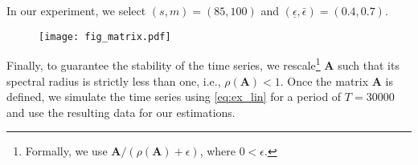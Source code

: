 In our experiment, we select $(s,m)=(85,100)$ and $(\underline{\epsilon},\bar{\epsilon})=(0.4,0.7)$. 
\begin{figure}
    \centering
    \texttt{[image: fig\_matrix.pdf]}
    \label{fig:matrix}
\end{figure}
Finally, to guarantee the stability of the time series, we rescale\footnote{Formally, we use $\textbf{A}/(\rho(\textbf{A}) + \epsilon)$, where $0<\epsilon$.} $\textbf{A}$ such that its spectral radius is strictly less than one, i.e.,  $\rho(\textbf{A})< 1$. 
Once the matrix $\textbf{A}$ is defined, we simulate the time series using \eqref{eq:ex_lin} for a period of $T = 30000$ and use the resulting data for our estimations.

